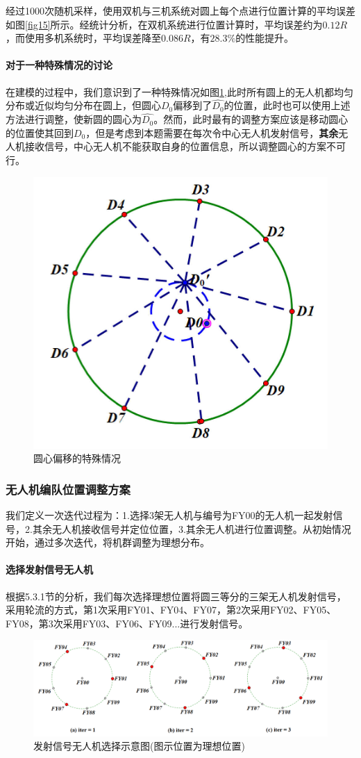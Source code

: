 \documentclass[withoutpreface,bwprint]{cumcmthesis} %
\begin{document}
			经过1000次随机采样，使用双机与三机系统对圆上每个点进行位置计算的平均误差如图\ref{fig15}所示。经统计分析，在双机系统进行位置计算时，平均误差约为$0.12R$，而使用多机系统时，平均误差降至$0.086R$，有$28.3\%$的性能提升。
			
			\paragraph{对于一种特殊情况的讨论}
			在建模的过程中，我们意识到了一种特殊情况如图\ref{fig17},此时所有圆上的无人机都均匀分布或近似均匀分布在圆上，但圆心$D_0$偏移到了$\widehat{D_0}$的位置，此时也可以使用上述方法进行调整，使新圆的圆心为$\widehat{D_0}$。然而，此时最有的调整方案应该是移动圆心的位置使其回到$D_0$，但是考虑到本题需要在每次令中心无人机发射信号，\textbf{其余}无人机接收信号，中心无人机不能获取自身的位置信息，所以调整圆心的方案不可行。
			\begin{figure}[H]
				\centering
				\includegraphics[width=0.45\linewidth]{./figures/17}
				\caption{圆心偏移的特殊情况}
				\label{fig17}
			\end{figure}
			
			
			
			
			
			\subsubsection{无人机编队位置调整方案}
			我们定义一次迭代过程为：1.选择3架无人机与编号为FY00的无人机一起发射信号，2.其余无人机接收信号并定位位置，3.其余无人机进行位置调整。从初始情况开始，通过多次迭代，将机群调整为理想分布。
			\paragraph{选择发射信号无人机}
			根据5.3.1节的分析，我们每次选择理想位置将圆三等分的三架无人机发射信号，采用轮流的方式，第1次采用FY01、FY04、FY07，第2次采用FY02、FY05、FY08，第3次采用FY03、FY06、FY09...进行发射信号。
			\begin{figure}[htb]
				\centering
				\includegraphics[width=1.0\linewidth]{./figures/发射信号无人机示意图}
				\caption{发射信号无人机选择示意图(图示位置为理想位置)}
				\label{发射信号飞机}
			\end{figure}
\end{document}

